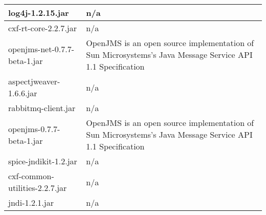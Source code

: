 \begin{center}
\begin{longtable}{|p{}|p{}|}
\hline 
log4j-1.2.15.jar & n/a\\
\hline 
cxf-rt-core-2.2.7.jar & n/a\\
\hline 
openjms-net-0.7.7-beta-1.jar & OpenJMS is an open source implementation of Sun Microsystems's Java Message Service API 1.1 Specification\\
\hline 
aspectjweaver-1.6.6.jar & n/a\\
\hline 
rabbitmq-client.jar & n/a\\
\hline 
openjms-0.7.7-beta-1.jar & OpenJMS is an open source implementation of Sun Microsystems's Java Message Service API 1.1 Specification\\
\hline 
spice-jndikit-1.2.jar & n/a\\
\hline 
cxf-common-utilities-2.2.7.jar & n/a\\
\hline 
jndi-1.2.1.jar & n/a\\
\hline 
\end{longtable}
\label{tabular:libraries}
\end{center}
